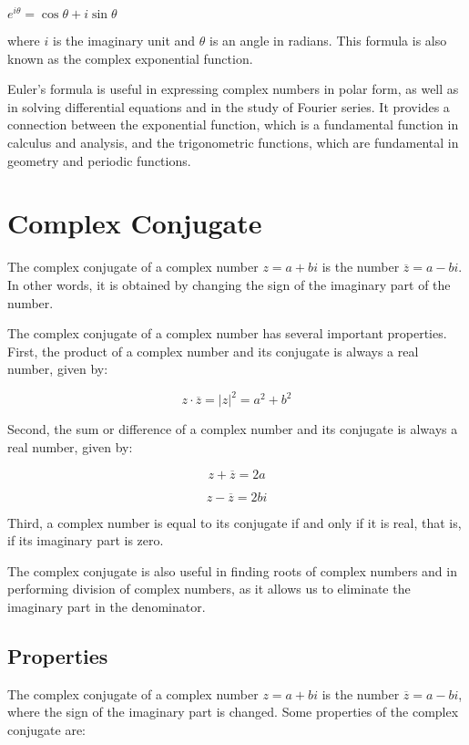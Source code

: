 \documentclass{article}
\begin{document}
$e^{i\theta} = \cos \theta + i \sin \theta$

where $i$ is the imaginary unit and $\theta$ is an angle in radians. This
formula is also known as the complex exponential function.

Euler's formula is useful in expressing complex numbers in polar form, as well
as in solving differential equations and in the study of Fourier series. It
provides a connection between the exponential function, which is a fundamental
function in calculus and analysis, and the trigonometric functions, which are
fundamental in geometry and periodic functions.

\section{Complex Conjugate}
The complex conjugate of a complex number $z = a + bi$ is the number $\overline{z} = a - bi$. In other words, it is obtained by changing the sign of the imaginary part of the number. 

The complex conjugate of a complex number has several important properties. First, the product of a complex number and its conjugate is always a real number, given by:

\[
z \cdot \overline{z} = |z|^2 = a^2 + b^2
\]

Second, the sum or difference of a complex number and its conjugate is always a real number, given by:

\[z + \overline{z} = 2a\]

\[
z - \overline{z} = 2bi
\]


Third, a complex number is equal to its conjugate if and only if it is real,
that is, if its imaginary part is zero. 

The complex conjugate is also useful in finding roots of complex numbers and in
performing division of complex numbers, as it allows us to eliminate the
imaginary part in the denominator.

\subsection{Properties}
The complex conjugate of a complex number $z = a + bi$ is the number
$\overline{z} = a - bi$, where the sign of the imaginary part is changed. Some
properties of the complex conjugate are:
\end{document}
